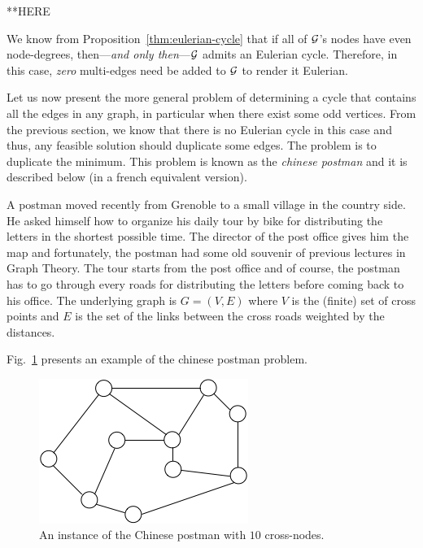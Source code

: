 **HERE


We know from Proposition~\ref{thm:eulerian-cycle} that if all of
$\mbox{$\cal G$}$'s nodes have even node-degrees, then---{\em and only then}---$\mbox{$\cal G$}$
admits an Eulerian cycle.  Therefore, in this case, {\em zero}
multi-edges need be added to $\mbox{$\cal G$}$ to render it Eulerian.  

Let us now present the more general problem of determining a cycle that contains all the edges in any graph, in particular when
there exist some odd vertices. From the previous section, we know that there is no Eulerian cycle in this case and thus, 
any feasible solution should duplicate some edges.
The problem is to duplicate the minimum.
This problem is known as the {\it chinese postman} and it is described below (in a french equivalent version).

A postman moved recently from Grenoble to a small village in the country side. 
He asked himself how to organize his daily tour by bike for distributing the letters in the shortest possible time. 
The director of the post office gives him the map and 
fortunately, the postman had some old souvenir of previous lectures in Graph Theory.  
The tour starts from the post office and of course, the postman has to go through every roads for distributing the letters before coming back
to his office.
The underlying graph is $G=(V,E)$ where $V$ is the (finite) set of cross points and $E$ is the set of the links between the cross roads
weighted by the distances.  

Fig.~\ref{fig:EulerianInitial} presents an example of the chinese postman problem. 
\begin{figure}[hbt]
\begin{center}
       \includegraphics[scale=0.6]{FiguresGraph/EulerienInitial}
       \caption{An instance of the Chinese postman with $10$ cross-nodes.}
              \label{fig:EulerianInitial}
\end{center}
\end{figure}

\bigskip

